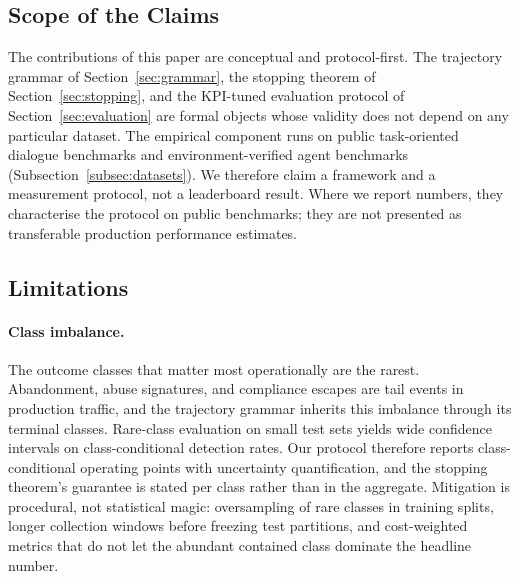 \subsection{Scope of the Claims}

The contributions of this paper are conceptual and protocol-first.
The trajectory grammar of Section~\ref{sec:grammar}, the stopping theorem of Section~\ref{sec:stopping}, and the KPI-tuned evaluation protocol of Section~\ref{sec:evaluation} are formal objects whose validity does not depend on any particular dataset.
The empirical component runs on public task-oriented dialogue benchmarks and environment-verified agent benchmarks (Subsection~\ref{subsec:datasets}).
We therefore claim a framework and a measurement protocol, not a leaderboard result.
Where we report numbers, they characterise the protocol on public benchmarks; they are not presented as transferable production performance estimates.

\subsection{Limitations}

\paragraph{Class imbalance.}
The outcome classes that matter most operationally are the rarest.
Abandonment, abuse signatures, and compliance escapes are tail events in production traffic, and the trajectory grammar inherits this imbalance through its terminal classes.
Rare-class evaluation on small test sets yields wide confidence intervals on class-conditional detection rates.
Our protocol therefore reports class-conditional operating points with uncertainty quantification, and the stopping theorem's guarantee is stated per class rather than in the aggregate.
Mitigation is procedural, not statistical magic: oversampling of rare classes in training splits, longer collection windows before freezing test partitions, and cost-weighted metrics that do not let the abundant contained class dominate the headline number.

